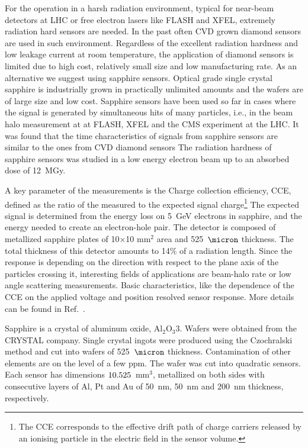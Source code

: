 For the operation in a harsh radiation environment, typical for near-beam detectors at LHC or free electron lasers like FLASH and XFEL, extremely radiation hard sensors are needed. In the past often CVD grown diamond sensors are used in such environment.
Regardless of the excellent radiation hardness and low leakage current at room temperature, the application of diamond sensors is limited due to high cost, relatively small size and low manufacturing rate. As an alternative we suggest using sapphire sensors. Optical grade single crystal sapphire is industrially grown in practically unlimited amounts and the wafers are of large size and low cost. Sapphire sensors have been used so far in cases where the signal is generated by simultaneous hits of many particles, i.e., in the beam halo measurement at at FLASH, XFEL and the CMS experiment at the LHC. It was found that the time characteristics of signals from sapphire sensors are similar to the ones from CVD diamond sensors
The radiation hardness of sapphire sensors was studied in a low
energy electron beam up to an absorbed dose of 12~MGy. 

A key parameter of the measurements is the Charge collection efficiency, CCE, defined as the ratio of the measured to the expected signal charge\footnote{The CCE corresponds to the effective drift path of charge carriers released by an ionising particle in the electric field in the sensor volume.} The expected signal is determined from the energy loss on 5~GeV electrons in sapphire, and the energy needed to create an electron-hole pair.
The  detector is composed of metallized sapphire plates of 10×10 mm$^2$ area and 525~$\micron$ thickness. The total thickness of this detector amounts to 14\% of a radiation length. Since the response is depending on the direction with respect to the plane axis of the particles crossing it, interesting fields of applications are beam-halo rate or low angle scattering measurements. Basic characteristics, like the dependence of the CCE on the applied voltage and position resolved sensor response. More details can be found in Ref.~\cite{Karacheban:2015jga}.

Sapphire is a crystal of aluminum oxide, Al$_2$O$_3$3. Wafers were obtained from the CRYSTAL company. 
Single crystal ingots were produced using the Czochralski method and
cut into wafers of 525~$\micron$ thickness. Contamination of other elements are on the level of a few ppm. The wafer was cut into quadratic sensors. Each sensor has dimensions $10 \time 10 \time 0.525$~mm$^3$, metallized on both sides with consecutive layers of Al, Pt and Au of 50~nm, 50~nm and 200~nm thickness, respectively.

